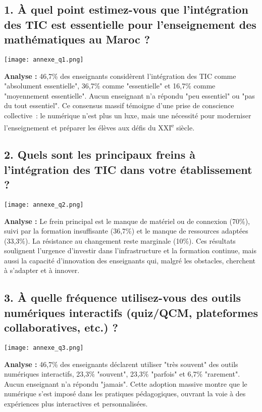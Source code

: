 \documentclass[a4paper,11pt]{report}
\begin{document}
\subsection*{1. À quel point estimez-vous que l'intégration des TIC est essentielle pour l'enseignement des mathématiques au Maroc ?}
\begin{center}
    \texttt{[image: annexe\_q1.png]}
\end{center}
\textbf{Analyse :} 46,7\% des enseignants considèrent l'intégration des TIC comme "absolument essentielle", 36,7\% comme "essentielle" et 16,7\% comme "moyennement essentielle". Aucun enseignant n'a répondu "peu essentiel" ou "pas du tout essentiel". Ce consensus massif témoigne d'une prise de conscience collective : le numérique n'est plus un luxe, mais une nécessité pour moderniser l'enseignement et préparer les élèves aux défis du XXI\textsuperscript{e} siècle.

\subsection*{2. Quels sont les principaux freins à l'intégration des TIC dans votre établissement ?}
\begin{center}
    \texttt{[image: annexe\_q2.png]}
\end{center}
\textbf{Analyse :} Le frein principal est le manque de matériel ou de connexion (70\%), suivi par la formation insuffisante (36,7\%) et le manque de ressources adaptées (33,3\%). La résistance au changement reste marginale (10\%). Ces résultats soulignent l'urgence d'investir dans l'infrastructure et la formation continue, mais aussi la capacité d'innovation des enseignants qui, malgré les obstacles, cherchent à s'adapter et à innover.

\subsection*{3. À quelle fréquence utilisez-vous des outils numériques interactifs (quiz/QCM, plateformes collaboratives, etc.) ?}
\begin{center}
    \texttt{[image: annexe\_q3.png]}
\end{center}
\textbf{Analyse :} 46,7\% des enseignants déclarent utiliser "très souvent" des outils numériques interactifs, 23,3\% "souvent", 23,3\% "parfois" et 6,7\% "rarement". Aucun enseignant n'a répondu "jamais". Cette adoption massive montre que le numérique s'est imposé dans les pratiques pédagogiques, ouvrant la voie à des expériences plus interactives et personnalisées.
\end{document}
